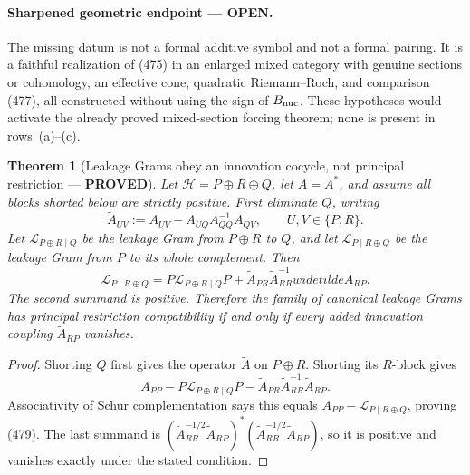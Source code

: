 \documentclass[11pt]{article}
\newtheorem{theorem}{Theorem}
\newcommand{\PROVED}{\textcolor{green!45!black}{\textbf{PROVED}}}
\newcommand{\OPEN}{\textcolor{red!70!black}{\textbf{OPEN}}}
\begin{document}
\paragraph{Sharpened geometric endpoint --- \OPEN.}
The missing datum is not a formal additive symbol and not a formal pairing.
It is a faithful realization of (475) in an enlarged mixed category with
genuine sections or cohomology, an effective cone, quadratic
Riemann--Roch, and comparison (477), all constructed without using the sign
of \(B_{\rm nuc}\).  These hypotheses would activate the already proved
mixed-section forcing theorem; none is present in rows~(a)--(c).

\begin{theorem}[Leakage Grams obey an innovation cocycle, not principal
restriction --- \PROVED]
Let
\(\mathcal H=P\oplus R\oplus Q\), let \(A=A^*\), and assume all blocks
shorted below are strictly positive.  First eliminate \(Q\), writing
\begin{equation}
 \widetilde A_{UV}:=A_{UV}-A_{UQ}A_{QQ}^{-1}A_{QV},
 \qquad U,V\in\{P,R\}.                              \tag{478}
\end{equation}
Let \(\mathscr L_{P\oplus R\mid Q}\) be the leakage Gram from
\(P\oplus R\) to \(Q\), and let
\(\mathscr L_{P\mid R\oplus Q}\) be the leakage Gram from \(P\) to its
whole complement.  Then
\begin{equation}
 \boxed{
 \mathscr L_{P\mid R\oplus Q}
 =P\mathscr L_{P\oplus R\mid Q}P
  +\widetilde A_{PR}\widetilde A_{RR}^{-1}widetilde A_{RP}.}   \tag{479}
\end{equation}
The second summand is positive.  Therefore the family of canonical leakage
Grams has principal restriction compatibility if and only if every added
innovation coupling \(\widetilde A_{RP}\) vanishes.
\end{theorem}

\begin{proof}
Shorting \(Q\) first gives the operator
\(\widetilde A\) on \(P\oplus R\).  Shorting its \(R\)-block gives
\[
 A_{PP}-P\mathscr L_{P\oplus R\mid Q}P
 -\widetilde A_{PR}\widetilde A_{RR}^{-1}\widetilde A_{RP}.
\]
Associativity of Schur complementation says this equals
\(A_{PP}-\mathscr L_{P\mid R\oplus Q}\), proving (479).  The last
summand is
\((\widetilde A_{RR}^{-1/2}\widetilde A_{RP})^*
  (\widetilde A_{RR}^{-1/2}\widetilde A_{RP})\), so it is positive and
vanishes exactly under the stated condition.
\end{proof}
\end{document}
